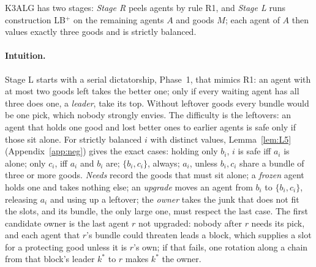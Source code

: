 \documentclass[runningheads,11pt]{llncs}
\newcommand{\LBp}{\texorpdfstring{\mbox{LB$^{+}$}}{LB+}}
\begin{document}
K3ALG has two stages: \emph{Stage R} peels agents by rule R1, and \emph{Stage L} runs construction \LBp{} on the remaining agents $A$ and goods $M$; each agent of $A$ then values exactly three goods and is strictly balanced.

\paragraph{Intuition.} Stage L starts with a serial dictatorship, Phase~1, that mimics R1: an agent with at most two goods left takes the better one; only if every waiting agent has all three does one, a \emph{leader}, take its top. Without leftover goods every bundle would be one pick, which nobody strongly envies. The difficulty is the leftovers: an agent that holds one good and lost better ones to earlier agents is safe only if those sit alone. For strictly balanced $i$ with distinct values, Lemma~\ref{lem:L5} (Appendix~\ref{app:neg}) gives the exact cases: holding only $b_i$, $i$ is safe iff $a_i$ is alone; only $c_i$, iff $a_i$ and $b_i$ are; $\{b_i,c_i\}$, always; $a_i$, unless $b_i,c_i$ share a bundle of three or more goods. \emph{Needs} record the goods that must sit alone; a \emph{frozen} agent holds one and takes nothing else; an \emph{upgrade} moves an agent from $b_i$ to $\{b_i,c_i\}$, releasing $a_i$ and using up a leftover; the \emph{owner} takes the junk that does not fit the slots, and its bundle, the only large one, must respect the last case. The first candidate owner is the last agent $r$ not upgraded: nobody after $r$ needs its pick, and each agent that $r$'s bundle could threaten leads a block, which supplies a slot for a protecting good unless it is $r$'s own; if that fails, one rotation along a chain from that block's leader $k^*$ to $r$ makes $k^*$ the owner.
\end{document}

